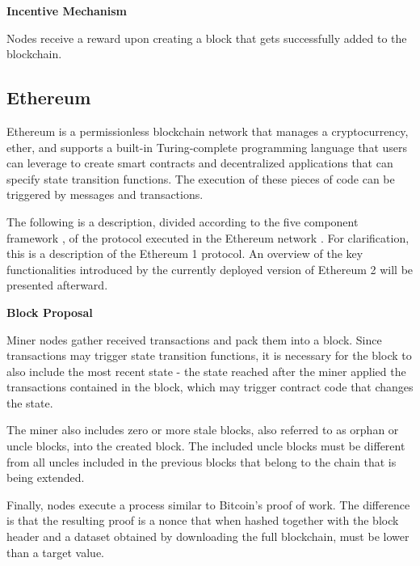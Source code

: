 \vspace{0.25cm}

\textbf{Incentive Mechanism}

Nodes receive a reward upon creating a block that gets successfully added to the blockchain.





\subsection{Ethereum}

Ethereum \cite{ethereum_whitepaper} \cite{ethereum_yellowpaper} is a permissionless blockchain network that manages a cryptocurrency, ether, and supports a built-in Turing-complete programming language that users can leverage to create smart contracts and decentralized applications that can specify state transition functions. The execution of these pieces of code can be triggered by messages and transactions.

The following is a description, divided according to the five component framework \cite{survey_bchain_networks}, of the protocol executed in the Ethereum network \cite{ethereum_whitepaper} \cite{ethereum_yellowpaper}. For clarification, this is a description of the Ethereum 1 protocol. An overview of the key functionalities introduced by the currently deployed version of Ethereum 2 \cite{eth2} will be presented afterward.


\vspace{0.5cm}

\textbf{Block Proposal}

Miner nodes gather received transactions and pack them into a block. Since transactions may trigger state transition functions, it is necessary for the block to also include the most recent state - the state reached after the miner applied the transactions contained in the block, which may trigger contract code that changes the state.

The miner also includes zero or more stale blocks, also referred to as orphan or uncle blocks, into the created block. The included uncle blocks must be different from all uncles included in the previous blocks that belong to the chain that is being extended.

Finally, nodes execute a process similar to Bitcoin’s proof of work. The difference is that the resulting proof is a nonce that when hashed together with the block header and a dataset obtained by downloading the full blockchain, must be lower than a target value.

